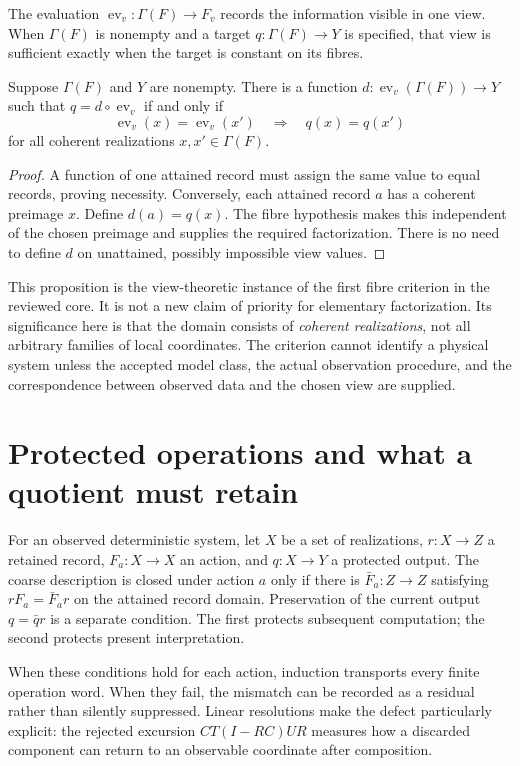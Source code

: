 The evaluation $\operatorname{ev}_v:\Gamma(F)\to F_v$ records the information visible in one view. When $\Gamma(F)$ is nonempty and a target $q:\Gamma(F)\to Y$ is specified, that view is sufficient exactly when the target is constant on its fibres.
\begin{proposition}\label{r:viewfactor}
Suppose $\Gamma(F)$ and $Y$ are nonempty. There is a function $d:\operatorname{ev}_v(\Gamma(F))\to Y$ such that $q=d\circ\operatorname{ev}_v$ if and only if
\[
\operatorname{ev}_v(x)=\operatorname{ev}_v(x')\quad\Longrightarrow\quad q(x)=q(x')
\]
for all coherent realizations $x,x'\in\Gamma(F)$.
\end{proposition}
\begin{proof}
A function of one attained record must assign the same value to equal records, proving necessity. Conversely, each attained record $a$ has a coherent preimage $x$. Define $d(a)=q(x)$. The fibre hypothesis makes this independent of the chosen preimage and supplies the required factorization. There is no need to define $d$ on unattained, possibly impossible view values.
\end{proof}

This proposition is the view-theoretic instance of the first fibre criterion in the reviewed core. It is not a new claim of priority for elementary factorization. Its significance here is that the domain consists of \emph{coherent realizations}, not all arbitrary families of local coordinates. The criterion cannot identify a physical system unless the accepted model class, the actual observation procedure, and the correspondence between observed data and the chosen view are supplied.

\section*{Protected operations and what a quotient must retain}
For an observed deterministic system, let $X$ be a set of realizations, $r:X\to Z$ a retained record, $F_a:X\to X$ an action, and $q:X\to Y$ a protected output. The coarse description is closed under action $a$ only if there is $\bar F_a:Z\to Z$ satisfying $rF_a=\bar F_a r$ on the attained record domain. Preservation of the current output $q=\bar q r$ is a separate condition. The first protects subsequent computation; the second protects present interpretation.

When these conditions hold for each action, induction transports every finite operation word. When they fail, the mismatch can be recorded as a residual rather than silently suppressed. Linear resolutions make the defect particularly explicit: the rejected excursion $CT(I-RC)UR$ measures how a discarded component can return to an observable coordinate after composition.

